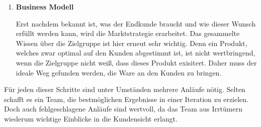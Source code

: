 \begin{enumerate}
	\item \textbf{Business Modell}
	
	Erst nachdem bekannt ist, was der Endkunde braucht und wie dieser Wunsch erfüllt werden kann, wird die Marktstrategie erarbeitet. Das gesammelte Wissen über die Zielgruppe ist hier erneut sehr wichtig. Denn ein Produkt, welches zwar optimal auf den Kunden abgestimmt ist, ist nicht wertbringend, wenn die Zielgruppe nicht weiß, dass dieses Produkt exisitert. Daher muss der ideale Weg gefunden werden, die Ware an den Kunden zu bringen. 
\end{enumerate}

Für jeden dieser Schritte sind unter Umständen mehrere Anläufe nötig. Selten schafft es ein Team, die bestmöglichen Ergebnisse in einer Iteration zu erzielen. Doch auch fehlgeschlagene Anläufe sind wertvoll, da das Team aus Irrtümern wiederum wichtige Einblicke in die Kundensicht erlangt. 
\cite[S. 17-42]{TheInnovatorsMethod}
\newpage 